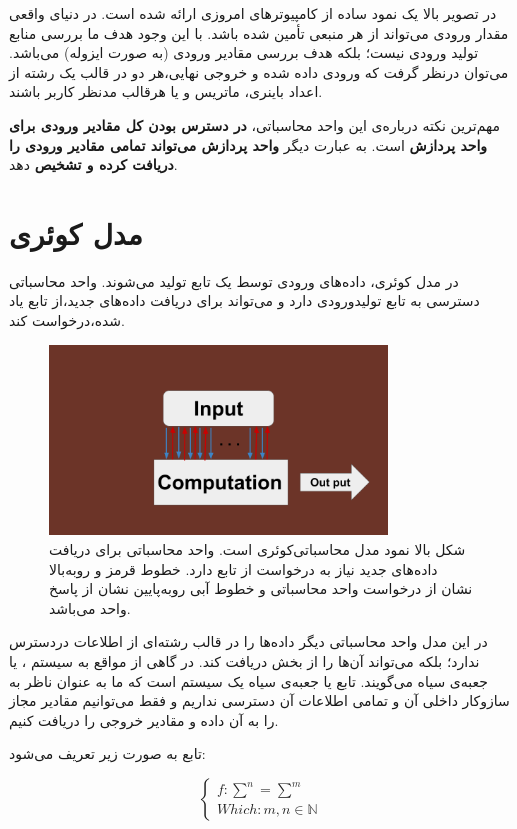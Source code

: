 \documentclass{book}
\begin{document}
در تصویر بالا یک نمود ساده از کامپیوتر‌های امروزی ارائه شده است. در دنیای واقعی مقدار ورودی می‌تواند از هر منبعی‌ تأمین شده باشد. با این وجود هدف ما بررسی منابع تولید ورودی نیست؛‌ بلکه هدف بررسی مقادیر ورودی (به صورت ایزوله) می‌باشد. می‌توان درنظر گرفت که ورودی داده شده و خروجی نهایی،‌هر دو در قالب یک رشته از اعداد باینری، ماتریس و یا هرقالب مدنظر کاربر باشند.

مهم‌ترین نکته درباره‌ی این واحد محاسباتی،‌ \textbf{در دسترس بودن کل مقادیر ورودی برای واحد پردازش} است. به عبارت دیگر\textbf{ واحد پردازش می‌تواند تمامی مقادیر ورودی را دریافت کرده و تشخیص} دهد. 

\section{مدل کوئری}
در مدل کوئری، داده‌های ورودی توسط یک تابع تولید می‌شوند. واحد محاسباتی دسترسی به تابع تولیدورودی دارد و می‌تواند برای دریافت داده‌های جدید،‌از تابع یاد شده،‌درخواست کند.

\begin{figure}[ht]
	\centering
	\includegraphics[width=0.8\textwidth]{Query computation model.png}
	\caption{شکل بالا نمود مدل محاسباتی‌کوئری است. واحد محاسباتی برای دریافت داده‌های جدید نیاز به درخواست از تابع  دارد. خطوط قرمز و روبه‌بالا نشان از درخواست واحد محاسباتی و خطوط آبی روبه‌پایین نشان از پاسخ واحد می‌باشد.}
\end{figure}


در این مدل واحد محاسباتی دیگر داده‌ها را در قالب رشته‌ای از اطلاعات دردسترس ندارد؛ بلکه می‌تواند آن‌ها را از بخش  دریافت کند. در گاهی از مواقع به سیستم ،‌ یا جعبه‌ی سیاه می‌گویند. تابع  یا جعبه‌ی سیاه یک سیستم است که ما به عنوان ناظر به سازوکار داخلی آن و  تمامی اطلاعات آن دسترسی نداریم و فقط می‌توانیم مقادیر مجاز را به آن داده و مقادیر خروجی را دریافت کنیم. 

تابع  به صورت زیر تعریف می‌شود:
\begin{center}
$$
\left\{
\begin{array}{ll}
f : \sum^n = \sum^m\\
Which : m, n \in \mathbb{N}
\end{array}
\right.
$$
\end{center}
\end{document}
